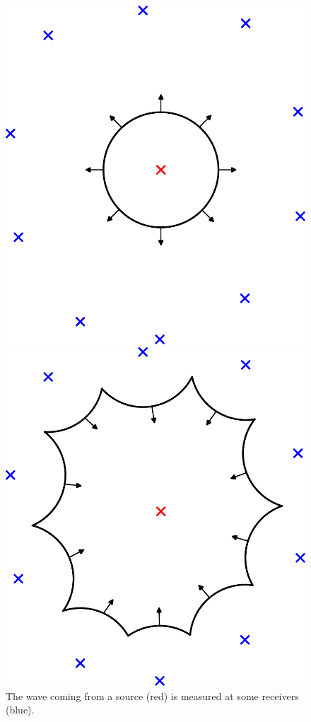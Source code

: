 \begin{figure}[ht]
    \centering
    \begin{minipage}{0.45\textwidth}
        \centering
        \includegraphics[width=\textwidth]{figures/WaveExpanding.pdf}
        \caption*{The wave coming from a source (red) is measured at some receivers (blue).}\label{fig:WaveTimeReversal}
    \end{minipage}\hfill
    \begin{minipage}{0.45\textwidth}
        \centering
        \includegraphics[width=\textwidth]{figures/WaveContracting.pdf}

\end{minipage}
\end{figure}
